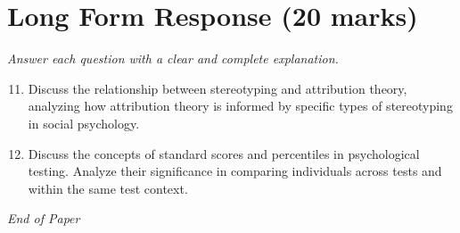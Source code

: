 \documentclass[12pt]{article}
\begin{document}
\section*{Long Form Response (20 marks)}
\textit{Answer each question with a clear and complete explanation.}
\begin{enumerate}[label=\arabic*.]
\setcounter{enumi}{10}
\item Discuss the relationship between stereotyping and attribution theory, analyzing how attribution theory is informed by specific types of stereotyping in social psychology.
\item Discuss the concepts of standard scores and percentiles in psychological testing. Analyze their significance in comparing individuals across tests and within the same test context.
\end{enumerate}

\vfill
\noindent\textit{End of Paper}
\end{document}
